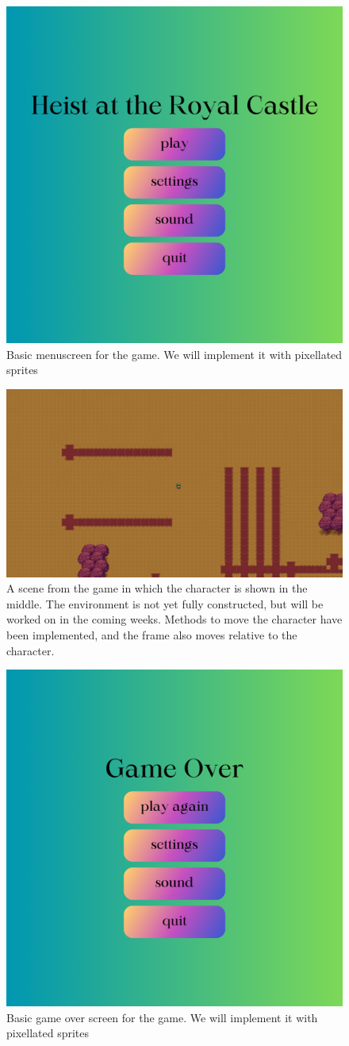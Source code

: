 \documentclass[12pt,a4paper]{article}
\begin{document}
\begin{figure}[htbp!]
\begin{center}
\includegraphics[width=0.5\columnwidth]{menu.png}
\end{center}
\caption{Basic menuscreen for the game. We will implement it with pixellated sprites}
\label{fig:menu}
\end{figure}

\begin{figure}[htbp!]
\begin{center}
\includegraphics[width=0.5\columnwidth]{game initial stage.jpg}
\end{center}
\caption{A scene from the game in which the character is shown in the middle. The environment is not yet fully constructed, but will be worked on in the coming weeks. Methods to move the character have been implemented, and the frame also moves relative to the character.}
\label{fig:gamewon}
\end{figure}

\begin{figure}[htbp!]
\begin{center}
\includegraphics[width=0.5\columnwidth]{gameover.png}
\end{center}
\caption{Basic game over screen for the game. We will implement it with pixellated sprites}
\label{fig:gameover}
\end{figure}
\end{document}
